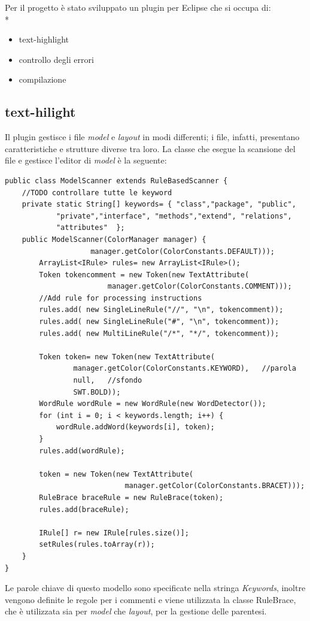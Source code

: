 Per il progetto è stato sviluppato un plugin per Eclipse che si occupa di: \\*
\begin{itemize}
  \item text-highlight
  \item controllo degli errori
  \item compilazione
\end{itemize} 


\subsection{text-hilight}
Il plugin gestisce i file \emph{model} e \emph{layout} in modi differenti; i 
file, infatti, presentano caratteristiche e strutture diverse tra loro.
La classe che esegue la scansione del file e gestisce l'editor di \emph{model} è
la seguente:

\begin{lstlisting}[caption={ModelScanner}, style={java}]
public class ModelScanner extends RuleBasedScanner {
	//TODO controllare tutte le keyword
	private static String[] keywords= { "class","package", "public",
			"private","interface", "methods","extend", "relations", 
			"attributes"  };
	public ModelScanner(ColorManager manager) {
					manager.getColor(ColorConstants.DEFAULT)));
		ArrayList<IRule> rules= new ArrayList<IRule>();	
		Token tokencomment = new Token(new TextAttribute(
						manager.getColor(ColorConstants.COMMENT)));
		//Add rule for processing instructions
		rules.add( new SingleLineRule("//", "\n", tokencomment));
		rules.add( new SingleLineRule("#", "\n", tokencomment));
		rules.add( new MultiLineRule("/*", "*/", tokencomment));
		
		Token token= new Token(new TextAttribute(
				manager.getColor(ColorConstants.KEYWORD), 	//parola
				null, 	//sfondo
				SWT.BOLD));
		WordRule wordRule = new WordRule(new WordDetector());
		for (int i = 0; i < keywords.length; i++) {
			wordRule.addWord(keywords[i], token);
		}		
		rules.add(wordRule);
		
		token = new Token(new TextAttribute(
							manager.getColor(ColorConstants.BRACET)));
		RuleBrace braceRule = new RuleBrace(token);
		rules.add(braceRule);
		
		IRule[] r= new IRule[rules.size()];
		setRules(rules.toArray(r));
	}
}
\end{lstlisting}


Le parole chiave di questo modello sono specificate nella stringa
\emph{Keywords}, inoltre vengono definite le regole per i commenti e viene
utilizzata la classe RuleBrace, che è utilizzata sia per \emph{model} che \emph{layout}, per
la gestione delle parentesi.

